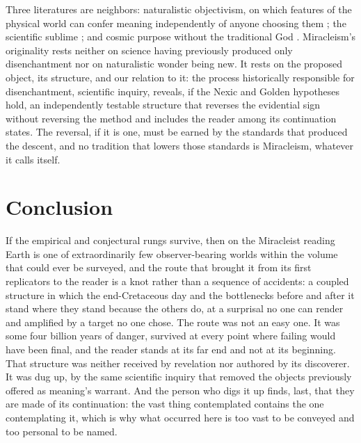 Three literatures are neighbors: naturalistic objectivism, on which features
of the physical world can confer meaning independently of anyone choosing
them \cite{MetzSEP}; the scientific sublime \cite{Gross18}; and cosmic
purpose without the traditional God \cite{Mulgan15,Goff23}. Miracleism's
originality rests neither on science having previously produced only
disenchantment nor on naturalistic wonder being new. It rests on the proposed
object, its structure, and our relation to it: the process historically
responsible for disenchantment, scientific inquiry, reveals, if the Nexic
and Golden hypotheses
hold, an independently testable structure that reverses the evidential sign
without reversing the method and includes the reader among its continuation
states. The reversal, if it is one, must be earned by the standards that
produced the descent, and no tradition that lowers those standards is
Miracleism, whatever it calls itself.

\section{Conclusion}

If the empirical and conjectural rungs survive, then on the Miracleist reading
Earth is one of extraordinarily few observer-bearing worlds within the volume
that could ever be surveyed, and the route that brought it from its first
replicators to the reader is a knot rather than a sequence of accidents: a
coupled structure in which the end-Cretaceous day and the bottlenecks before
and after it stand where they stand because the others do, at a surprisal no
one can render and amplified by a target no one chose.
The route was not an easy one. It was some four billion years of danger,
survived at every point where failing would have been final, and the
reader stands at its far end and not at its beginning.
That structure was
neither received by revelation nor authored by its discoverer. It was dug up,
by the same scientific inquiry that removed the objects previously offered as meaning's
warrant. And the person who digs it up finds, last, that they are made of its
continuation: the vast thing contemplated contains the one contemplating it,
which is why what occurred here is too vast to be conveyed and too personal to
be named.

